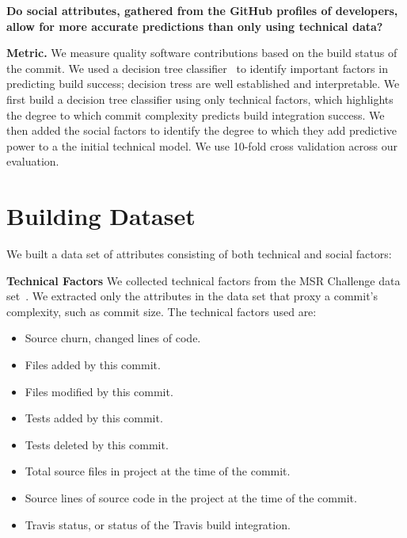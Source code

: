 \documentclass[10pt, conference]{IEEEtran}
\begin{document}
\textbf{Do social attributes, gathered 
from the GitHub profiles of developers,
allow for more accurate predictions than only using technical data?}

\begin{comment}
we have created a dataset with technical attributes to be able to analyze the 
predictive power of these attributes and its relationship with commit integration 
success. This way, we are able to create a model
We are afterwards interested in knowing if adding social attributes to this 
predictability model will increase the probability of the model asserting 
correctly future instances by knowing not only technical data about the commit 
being pushed but also social attributes of the developer pushing the changes.
\end{comment}

\vspace{1ex}
\noindent\textbf{Metric.} We measure quality software contributions based on the build status of the
commit. We used a decision tree classifier~\cite{Quinlan86} to identify
important factors in predicting build success;  decision tress are well
established  and interpretable. 
We first build a
decision tree classifier using only technical factors, which highlights
the degree to which commit complexity predicts build integration
success.  We then added the social factors to identify the degree to which they
add predictive power to a the initial technical model. 
We use 10-fold cross validation across our evaluation. 

\section{Building Dataset}
\label{approach}

We built a data set of
attributes consisting of both technical and social factors:

\vspace{1ex}
\noindent\textbf{Technical Factors} We collected technical factors from the 
MSR Challenge data set~\cite{msr17challenge}.
We extracted only the attributes in the data set that proxy a commit's
complexity, such as commit size. 
The technical factors used are:
\begin{itemize}
\item Source churn, changed lines of code.
\item Files added by this commit.
\item Files modified by this commit.
\item Tests added by this commit.
\item Tests deleted by this commit.
\item Total source files in project at the time of the commit.
\item Source lines of source code in the project at
	the time of the commit.
\item Travis status, or status of the Travis build integration.
\end{itemize}
\end{document}
